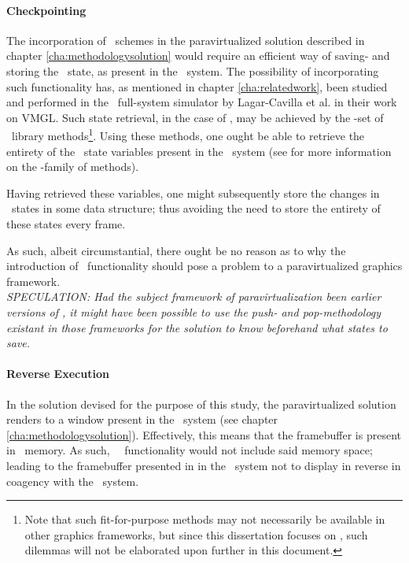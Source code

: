 \paragraph{Checkpointing}
\label{par:appendixa_simicsproductification_checkpointing}
The incorporation of \dvttermcheckpointrestart\ schemes in the paravirtualized solution described in chapter \ref{cha:methodologysolution} would require an efficient way of saving- and storing the \dvttermopengl\ state, as present in the \dvttermhost\ system.
The possibility of incorporating such functionality has, as mentioned in chapter \ref{cha:relatedwork}, been studied and performed in the \dvttermqemu\ full-system simulator by Lagar-Cavilla et al. in their work on VMGL.
Such state retrieval, in the case of \dvttermopenglestwopointo , may be achieved by the -set of \dvttermopengl\ library methods\footnote{Note that such fit-for-purpose methods may not necessarily be available in other graphics frameworks, but since this dissertation focuses on \dvttermopenglestwopointo , such dilemmas will not be elaborated upon further in this document.}.
Using these methods, one ought be able to retrieve the entirety of the \dvttermopengl\ state variables present in the \dvttermhost\ system (see  for more information on the -family of methods).

Having retrieved these variables, one might subsequently store the changes in \dvttermopengl\ states in some data structure; thus avoiding the need to store the entirety of these states every frame.

As such, albeit circumstantial, there ought be no reason as to why the introduction of \dvttermcheckpoint\ functionality should pose a problem to a paravirtualized graphics framework.\\

\textit{SPECULATION: Had the subject framework of paravirtualization been earlier versions of \dvttermopengl , it might have been possible to use the push- and pop-methodology existant in those frameworks for the solution to know beforehand what states to save.}

\paragraph{Reverse Execution}
\label{par:appendixa_simicsproductification_reverseexecution}
In the solution devised for the purpose of this study, the paravirtualized solution renders to a window present in the \dvttermhost\ system (see chapter \ref{cha:methodologysolution}).
Effectively, this means that the framebuffer is present in \dvttermhost\ memory.
As such, \dvttermsimics\ \dvttermreverseexecution\ functionality would not include said memory space; leading to the framebuffer presented in in the \dvttermhost\ system not to display in reverse in coagency with the  \dvttermtarget\ system.

